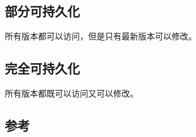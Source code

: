 
\subsection{部分可持久化}

所有版本都可以访问，但是只有最新版本可以修改。

\subsection{完全可持久化}

所有版本都既可以访问又可以修改。

\subsection{参考}

\href{https://en.wikipedia.org/wiki/Persistent_data_structure}{}
